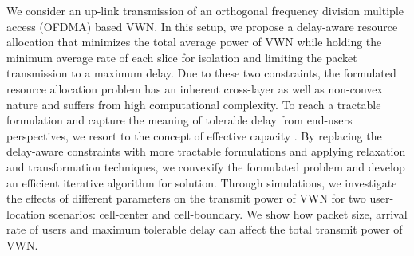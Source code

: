 \documentclass[journal,draftclsnofoot,12pt,onecolumn]{IEEEtran}
\begin{document}
We consider an up-link transmission of an orthogonal frequency division multiple access (OFDMA) based VWN. In this setup, we propose a delay-aware resource allocation that minimizes the total average power of VWN while holding the minimum average rate of each slice for isolation and limiting the packet transmission to a maximum delay. Due to these two constraints, the formulated resource allocation problem has an inherent cross-layer as well as non-convex nature and suffers from high computational complexity. To reach a tractable formulation and capture the meaning of tolerable delay from end-users perspectives, we resort to the concept of effective capacity \cite{4290029,4205048,4024729}. By replacing the delay-aware constraints with more tractable formulations and applying relaxation and transformation techniques, we convexify the formulated problem and develop an efficient iterative algorithm for solution. Through simulations, we investigate the effects of different parameters on the transmit power of VWN for two user-location scenarios: cell-center and cell-boundary. We show how packet size, arrival rate of users and maximum tolerable delay can affect the total transmit power of VWN.



\end{document}
